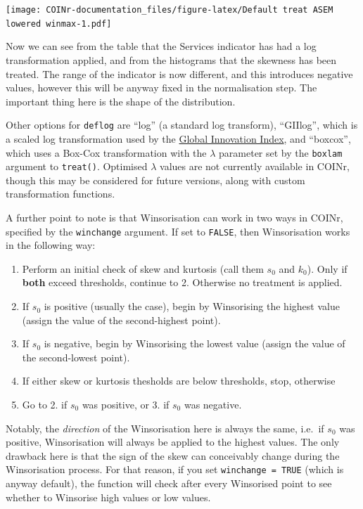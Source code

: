 \documentclass[
]{book}
\providecommand{\tightlist}{%
  \setlength{\itemsep}{0pt}\setlength{\parskip}{0pt}}
\begin{document}
\texttt{[image: COINr-documentation\_files/figure-latex/Default treat ASEM lowered winmax-1.pdf]}

Now we can see from the table that the Services indicator has had a log transformation applied, and from the histograms that the skewness has been treated. The range of the indicator is now different, and this introduces negative values, however this will be anyway fixed in the normalisation step. The important thing here is the shape of the distribution.

Other options for \texttt{deflog} are ``log'' (a standard log transform), ``GIIlog'', which is a scaled log transformation used by the \href{https://www.globalinnovationindex.org/}{Global Innovation Index}, and ``boxcox'', which uses a Box-Cox transformation with the \(\lambda\) parameter set by the \texttt{boxlam} argument to \texttt{treat()}. Optimised \(\lambda\) values are not currently available in COINr, though this may be considered for future versions, along with custom transformation functions.

A further point to note is that Winsorisation can work in two ways in COINr, specified by the \texttt{winchange} argument. If set to \texttt{FALSE}, then Winsorisation works in the following way:

\begin{enumerate}
\def\labelenumi{\arabic{enumi}.}
\tightlist
\item
  Perform an initial check of skew and kurtosis (call them \(s_0\) and \(k_0\)). Only if \textbf{both} exceed thresholds, continue to 2. Otherwise no treatment is applied.
\item
  If \(s_0\) is positive (usually the case), begin by Winsorising the highest value (assign the value of the second-highest point).
\item
  If \(s_0\) is negative, begin by Winsorising the lowest value (assign the value of the second-lowest point).
\item
  If either skew or kurtosis thesholds are below thresholds, stop, otherwise
\item
  Go to 2. if \(s_0\) was positive, or 3. if \(s_0\) was negative.
\end{enumerate}

Notably, the \emph{direction} of the Winsorisation here is always the same, i.e.~if \(s_0\) was positive, Winsorisation will always be applied to the highest values. The only drawback here is that the sign of the skew can conceivably change during the Winsorisation process. For that reason, if you set \texttt{winchange\ =\ TRUE} (which is anyway default), the function will check after every Winsorised point to see whether to Winsorise high values or low values.
\end{document}
